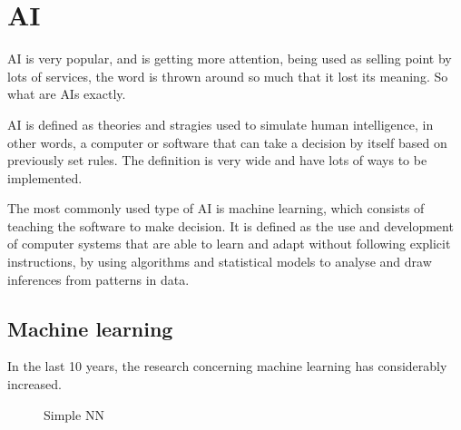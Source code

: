 \section{\acl{AI}}\label{sec:ai}

\acf{AI} is very popular, and is getting more attention, being used as selling point by lots of services, the word is thrown around so much that it lost its meaning. So what are \acp{AI} exactly.

\ac{AI} is defined as theories and stragies used to simulate human intelligence, in other words, a computer or software that can take a decision by itself based on previously set rules. The definition is very wide and have lots of ways to be implemented.

The most commonly used type of \ac{AI} is machine learning, which consists of teaching the software to make decision. It is defined as the use and development of computer systems that are able to learn and adapt without following explicit instructions, by using algorithms and statistical models to analyse and draw inferences from patterns in data.

\subsection{Machine learning}

In the last 10 years, the research concerning machine learning has considerably increased.

\begin{figure}[H]
  \centering
  
  \caption{Simple \acl{NN}}
  \label{fig:snn}
\end{figure}
